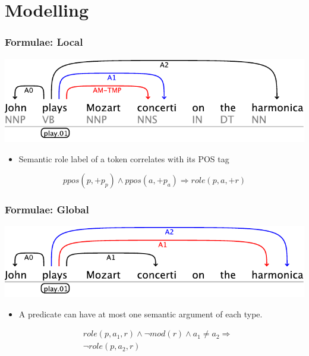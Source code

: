 \documentclass{beamer} \setbeamertemplate{navigation symbols}{}
\begin{document}
\section{Modelling}




\begin{frame}
  \frametitle{Formulae: Local}
    
  \begin{center}
    \includegraphics[scale=.70]{example-3}
  \end{center}

  \begin{itemize}
  \item Semantic role label of a token correlates with its POS tag
  \end{itemize}

  \[ppos(p,+p_p) \wedge ppos(a,+p_a) \Rightarrow role(p,a,+r)\]

\end{frame}


\begin{frame}
  \frametitle{Formulae: Global}
  \begin{center}
    \includegraphics[scale=.70]{example-2}
  \end{center}

  \begin{itemize}
  \item A predicate can have at most one semantic argument of each
    type.
  \end{itemize}

 \begin{eqnarray*}
   &role\left(p,a_{1},r\right)\wedge \neg mod\left(r\right)\wedge a_{1}\neq a_{2}  \Rightarrow\\
   & \neg role\left(p,a_{2},r\right)
 \end{eqnarray*}


\end{frame}
\end{document}

